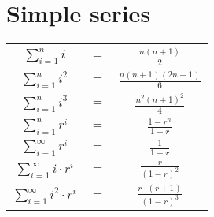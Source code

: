 \section{Simple series}

\begin{center}
\begin{tabular}{ccc}
\hline
\hline
$\sum\limits_{i=1}^{n} i  $ & $=$ & $\frac{n(n+1)}{2}$ \\
\hline
$\sum\limits_{i=1}^{n} i^2$ & $=$ & $\frac{n(n+1)(2n + 1)}{6}$ \\
\hline
$\sum\limits_{i=1}^{n} i^3$ & $=$ & $\frac{n^2(n+1)^2}{4}$ \\
\hline
\hline
$\sum\limits_{i = 1}^n r^i$ & $=$ & $\frac{1-r^n}{1-r}$\\ 
\hline
$\sum\limits_{i = 1}^\infty r^i$ & $=$ & $\frac{1}{1-r}$\\ 
\hline
$\sum\limits_{i = 1}^\infty i \cdot r^i$ & $=$ & $\frac{r}{(1-r)^2}$\\ 
\hline
$\sum\limits_{i = 1}^\infty i^2 \cdot r^i$ & $=$ & $\frac{r\cdot(r+1)}{(1-r)^3}$\\ 
\hline
\hline
\end{tabular}
\end{center}
